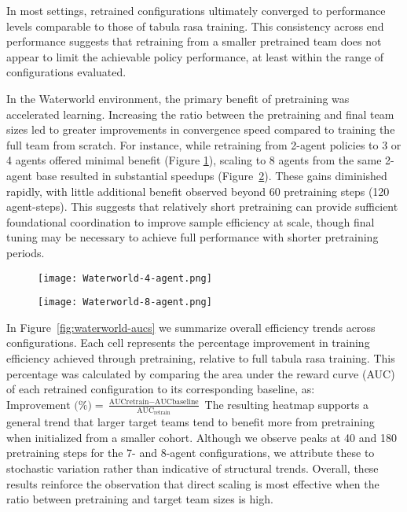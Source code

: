 \documentclass{article}
\begin{document}
In most settings, retrained configurations ultimately converged to 
performance levels comparable to those of tabula rasa training.
This consistency across end performance suggests that retraining from a smaller 
pretrained team does not appear to limit the achievable policy performance, 
at least within the range of configurations evaluated.

In the Waterworld environment, the primary benefit of pretraining was accelerated learning. 
Increasing the ratio between the pretraining and final team sizes led to greater improvements 
in convergence speed compared to training the full team from scratch. For instance, 
while retraining from 2-agent policies to 3 or 4 agents offered minimal benefit 
(Figure \ref{fig:waterworld-4}), scaling to 8 agents from the same 2-agent base resulted in 
substantial speedups (Figure~\ref{fig:waterworld-8}). These gains diminished rapidly, 
with little additional benefit observed beyond 60 pretraining steps (120 agent-steps).
This suggests that relatively short pretraining can provide sufficient foundational 
coordination to improve sample efficiency at scale, though final tuning may 
be necessary to achieve full performance with shorter pretraining periods.

\begin{figure}[h]
    \centering
    \texttt{[image: Waterworld-4-agent.png]}
    \caption{}
    \label{fig:waterworld-4}
\end{figure}

\begin{figure}[h]
    \centering
    \texttt{[image: Waterworld-8-agent.png]}
    \caption{}
    \label{fig:waterworld-8}
\end{figure}

In Figure~\ref{fig:waterworld-aucs} we summarize overall efficiency trends across configurations. 
Each cell represents the percentage improvement in training efficiency 
achieved through pretraining, relative to full tabula rasa training.
This percentage was calculated by comparing the area under the reward curve 
(AUC) of each retrained configuration to its corresponding baseline, as: $\text{Improvement (\%)} 
= \frac{\text{AUC}{\text{retrain}} - \text{AUC}{\text{baseline}}}{\text{AUC}_{\text{retrain}}}$
The resulting heatmap supports a general trend that larger target teams tend to 
benefit more from pretraining when initialized from a smaller cohort.
Although we observe peaks at 40 and 180 pretraining steps for the 7- and 8-agent configurations, 
we attribute these to stochastic variation rather than indicative of structural trends.
Overall, these results reinforce the observation that direct scaling is most effective 
when the ratio between pretraining and target team sizes is high.
\end{document}
